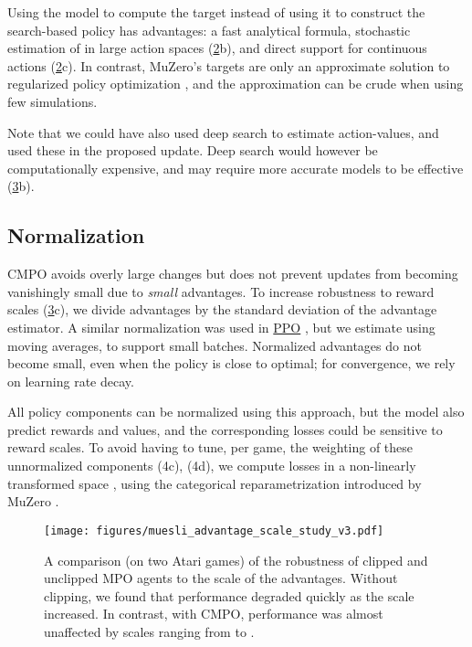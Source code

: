 \documentclass{article}
\newcommand{\desirePolicy}[1]{(\hyperref[table-desiderata]{2}#1)}
\newcommand{\desireRobust}[1]{(\hyperref[table-desiderata]{3}#1)}
\begin{document}
Using the model to compute the  target instead of using it to construct the search-based policy  has advantages: a fast analytical formula, stochastic estimation of  in large action spaces \desirePolicy{b}, and direct support for continuous actions \desirePolicy{c}. In contrast, MuZero's targets  are only an approximate solution to regularized policy optimization \cite{jbgrill2020}, and the approximation can be crude when using few simulations.

Note that we could have also used deep search to estimate action-values, and used these in the proposed update. Deep search would however be computationally expensive, and may require more accurate models to be effective \desireRobust{b}.

\subsection{Normalization}
\label{sec:advantage_normalization}
CMPO avoids overly large changes but does not prevent updates from becoming vanishingly small due to \emph{small} advantages. To increase robustness to reward scales \desireRobust{c}, we divide advantages  by the standard deviation of the advantage estimator. A similar normalization was used in  \href{https://github.com/openai/baselines/blob/9b68103b737ac46bc201dfb3121cfa5df2127e53/baselines/ppo2/model.py\#L139}{PPO} \citep{schulman2017proximal}, but we estimate  using moving averages, to support small batches. Normalized advantages do not become small, even when the policy is close to optimal; for convergence, we rely on learning rate decay.

All policy components can be normalized using this approach, but the model also predict rewards and values, and the corresponding losses could be sensitive to reward scales. To avoid having to tune, per game, the weighting of these unnormalized components (4c), (4d), we compute losses in a non-linearly transformed space \cite{Pohlen18,vanHasselt2019nonlin}, using the categorical reparametrization introduced by MuZero \cite{schrittwieser2019}.

\begin{figure}[t]
\vskip 0.1in
\centering
    \texttt{[image: figures/muesli\_advantage\_scale\_study\_v3.pdf]}
\vskip -0.03in
\caption{A comparison (on two Atari games) of the robustness of clipped and unclipped MPO agents to the scale of the advantages. Without clipping, we found that performance degraded quickly as the scale increased. In contrast, with CMPO, performance was almost unaffected by scales ranging from  to .}
\vskip -0.15in
\label{fig:advantage_scale}
\end{figure}
\end{document}
